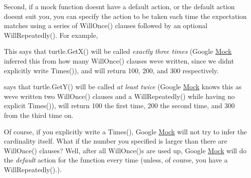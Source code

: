 Second, if a mock function doesn\textquotesingle{}t have a default action, or the default action doesn\textquotesingle{}t suit you, you can specify the action to be taken each time the expectation matches using a series of {\ttfamily Will\+Once()} clauses followed by an optional {\ttfamily Will\+Repeatedly()}. For example,


\begin{DoxyCode}{0}
\end{DoxyCode}


This says that {\ttfamily turtle.\+Get\+X()} will be called {\itshape exactly three times} (Google \mbox{\hyperlink{class_mock}{Mock}} inferred this from how many {\ttfamily Will\+Once()} clauses we\textquotesingle{}ve written, since we didn\textquotesingle{}t explicitly write {\ttfamily Times()}), and will return 100, 200, and 300 respectively.


\begin{DoxyCode}{0}
\end{DoxyCode}


says that {\ttfamily turtle.\+Get\+Y()} will be called {\itshape at least twice} (Google \mbox{\hyperlink{class_mock}{Mock}} knows this as we\textquotesingle{}ve written two {\ttfamily Will\+Once()} clauses and a {\ttfamily Will\+Repeatedly()} while having no explicit {\ttfamily Times()}), will return 100 the first time, 200 the second time, and 300 from the third time on.

Of course, if you explicitly write a {\ttfamily Times()}, Google \mbox{\hyperlink{class_mock}{Mock}} will not try to infer the cardinality itself. What if the number you specified is larger than there are {\ttfamily Will\+Once()} clauses? Well, after all {\ttfamily Will\+Once()}s are used up, Google \mbox{\hyperlink{class_mock}{Mock}} will do the {\itshape default} action for the function every time (unless, of course, you have a {\ttfamily Will\+Repeatedly()}.).

